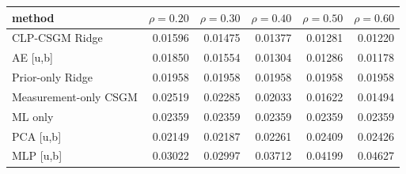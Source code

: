 \begin{tabular}{lrrrrr}
\toprule
method & $\rho=0.20$ & $\rho=0.30$ & $\rho=0.40$ & $\rho=0.50$ & $\rho=0.60$ \\
\midrule
CLP-CSGM Ridge & 0.01596 & 0.01475 & 0.01377 & 0.01281 & 0.01220 \\
AE [u,b] & 0.01850 & 0.01554 & 0.01304 & 0.01286 & 0.01178 \\
Prior-only Ridge & 0.01958 & 0.01958 & 0.01958 & 0.01958 & 0.01958 \\
Measurement-only CSGM & 0.02519 & 0.02285 & 0.02033 & 0.01622 & 0.01494 \\
ML only & 0.02359 & 0.02359 & 0.02359 & 0.02359 & 0.02359 \\
PCA [u,b] & 0.02149 & 0.02187 & 0.02261 & 0.02409 & 0.02426 \\
MLP [u,b] & 0.03022 & 0.02997 & 0.03712 & 0.04199 & 0.04627 \\
\bottomrule
\end{tabular}
